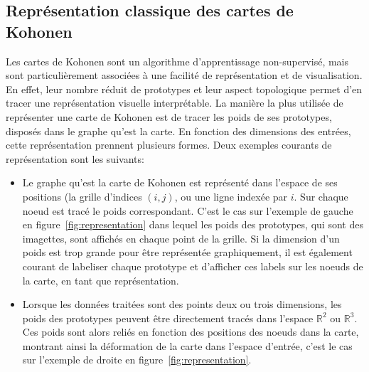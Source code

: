 \subsection{Représentation classique des cartes de Kohonen}

Les cartes de Kohonen sont un algorithme d'apprentissage non-supervisé, mais sont particulièrement associées à une facilité de représentation et de visualisation. En effet, leur nombre réduit de prototypes et leur aspect topologique permet d'en tracer une représentation visuelle interprétable.
La manière la plus utilisée de représenter une carte de Kohonen est de tracer les poids de ses prototypes, disposés dans le graphe qu'est la carte. En fonction des dimensions des entrées, cette représentation prennent plusieurs formes. Deux exemples courants de représentation sont les suivants: 
\begin{itemize}
\item Le graphe qu'est la carte de Kohonen est représenté dans l'espace de ses positions (la grille d'indices $(i,j)$, ou une ligne indexée par $i$. Sur chaque noeud est tracé le poids correspondant. C'est le cas sur l'exemple de gauche en figure~\ref{fig:representation} dans lequel les poids des prototypes, qui sont des imagettes, sont affichés en chaque point de la grille. Si la dimension d'un poids est trop grande pour être représentée graphiquement, il est également courant de labeliser chaque prototype et d'afficher ces labels sur les noeuds de la carte, en tant que représentation.
\item Lorsque les données traitées sont des points deux ou trois dimensions, les poids des prototypes peuvent être directement tracés dans l'espace $\mathbb{R}^2$ ou $\mathbb{R}^3$. Ces poids sont alors reliés en fonction des positions des noeuds dans la carte, montrant ainsi la déformation de la carte dans l'espace d'entrée, c'est le cas sur l'exemple de droite en figure~\ref{fig:representation}.
\end{itemize}

